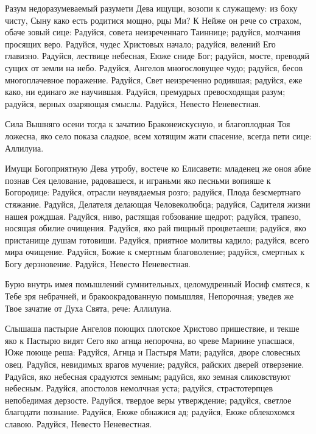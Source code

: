 
Разум недоразумеваемый разумети Дева ищущи, возопи к служащему: из боку чисту, Сыну како есть родитися мощно, рцы Ми? К Нейже он рече со страхом, обаче зовый сице: Радуйся, совета неизреченнаго Таиннице; радуйся, молчания просящих веро. Радуйся, чудес Христовых начало; радуйся, велений Его главизно. Радуйся, лествице небесная, Еюже сниде Бог; радуйся, мосте, преводяй сущих от земли на небо. Радуйся, Ангелов многословущее чудо; радуйся, бесов многоплачевное поражение. Радуйся, Свет неизреченно родившая; радуйся, еже како, ни единаго же научившая. Радуйся, премудрых превосходящая разум; радуйся, верных озаряющая смыслы. Радуйся, Невесто Неневестная.




Сила Вышняго осени тогда к зачатию Браконеискусную, и благоплодная Тоя ложесна, яко село показа сладкое, всем хотящим жати спасение, всегда пети сице: Аллилуиа.




Имущи Богоприятную Дева утробу, востече ко Елисавети: младенец же оноя абие познав Сея целование, радовашеся, и играньми яко песньми вопияше к Богородице: Радуйся, отрасли неувядаемыя розго; радуйся, Плода безсмертнаго стяжание. Радуйся, Делателя делающая Человеколюбца; радуйся, Садителя жизни нашея рождшая. Радуйся, ниво, растящая гобзование щедрот; радуйся, трапезо, носящая обилие очищения. Радуйся, яко рай пищный процветаеши; радуйся, яко пристанище душам готовиши. Радуйся, приятное молитвы кадило; радуйся, всего мира очищение. Радуйся, Божие к смертным благоволение; радуйся, смертных к Богу дерзновение. Радуйся, Невесто Неневестная.




Бурю внутрь имея помышлений сумнительных, целомудренный Иосиф смятеся, к Тебе зря небрачней, и бракоокрадованную помышляя, Непорочная; уведев же Твое зачатие от Духа Свята, рече: Аллилуиа.




Слышаша пастырие Ангелов поющих плотское Христово пришествие, и текше яко к Пастырю видят Сего яко агнца непорочна, во чреве Мариине упасшася, Юже поюще реша: Радуйся, Агнца и Пастыря Мати; радуйся, дворе словесных овец. Радуйся, невидимых врагов мучение; радуйся, райских дверей отверзение. Радуйся, яко небесная срадуются земным; радуйся, яко земная сликовствуют небесным. Радуйся, апостолов немолчная уста; радуйся, страстотерпцев непобедимая дерзосте. Радуйся, твердое веры утверждение; радуйся, светлое благодати познание. Радуйся, Еюже обнажися ад; радуйся, Еюже облекохомся славою. Радуйся, Невесто Неневестная.


